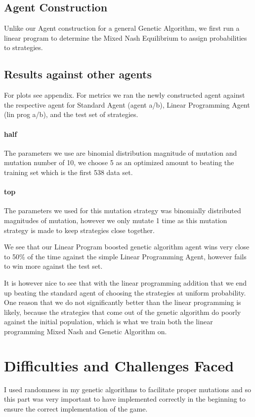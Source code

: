 \documentclass[12pt,letter]{article}
\begin{document}
\subsection{Agent Construction}
Unlike our Agent construction for a general Genetic Algorithm, we first run a linear program to determine the Mixed Nash Equilibrium to assign probabilities to strategies.

\subsection{Results against other agents}
For plots see appendix.
For metrics we ran the newly constructed agent against the respective agent for Standard Agent (agent a/b), Linear Programming Agent (lin prog a/b), and the test set of strategies. 

\paragraph{half} The parameters we use are binomial distribution magnitude of mutation and mutation number of 10, we choose 5 as an optimized amount to beating the training set which is the first 538 data set.

\paragraph{top} The parameters we used for this mutation strategy was binomially distributed magnitudes of mutation, however we only mutate 1 time as this mutation strategy is made to keep strategies close together.

We see that our Linear Program boosted genetic algorithm agent wins very close to 50\% of the time against the simple Linear Programming Agent, however fails to win more against the test set.

It is however nice to see that with the linear programming addition that we end up beating the standard agent of choosing the strategies at uniform probability.
One reason that we do not significantly better than the linear programming is likely, because the strategies that come out of the genetic algorithm do poorly against the initial population, which is what we train both the linear programming Mixed Nash and Genetic Algorithm on.




\section{Difficulties and Challenges Faced}
I used randomness in my genetic algorithms to facilitate proper mutations and so this part was very important to have implemented correctly in the beginning to ensure the correct implementation of the game.
\end{document}
